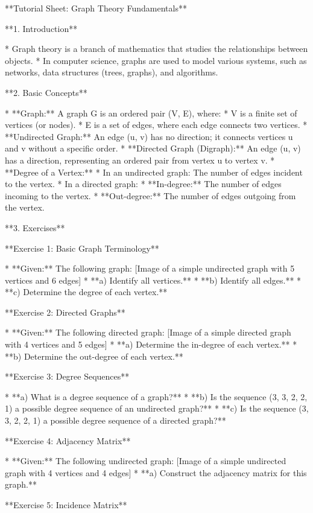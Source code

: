 **Tutorial Sheet: Graph Theory Fundamentals**

**1. Introduction**

*   Graph theory is a branch of mathematics that studies the relationships between objects. 
*   In computer science, graphs are used to model various systems, such as networks, data structures (trees, graphs), and algorithms.

**2. Basic Concepts**

*   **Graph:** A graph G is an ordered pair (V, E), where:
      *   V is a finite set of vertices (or nodes).
      *   E is a set of edges, where each edge connects two vertices.
*   **Undirected Graph:** An edge (u, v) has no direction; it connects vertices u and v without a specific order.
*   **Directed Graph (Digraph):** An edge (u, v) has a direction, representing an ordered pair from vertex u to vertex v.
*   **Degree of a Vertex:** 
      *   In an undirected graph: The number of edges incident to the vertex.
      *   In a directed graph: 
          *   **In-degree:** The number of edges incoming to the vertex.
          *   **Out-degree:** The number of edges outgoing from the vertex.

**3. Exercises**

**Exercise 1: Basic Graph Terminology**

*   **Given:** The following graph:
      [Image of a simple undirected graph with 5 vertices and 6 edges]
*   **a) Identify all vertices.**
*   **b) Identify all edges.**
*   **c) Determine the degree of each vertex.**

**Exercise 2: Directed Graphs**

*   **Given:** The following directed graph:
      [Image of a simple directed graph with 4 vertices and 5 edges]
*   **a) Determine the in-degree of each vertex.**
*   **b) Determine the out-degree of each vertex.**

**Exercise 3: Degree Sequences**

*   **a) What is a degree sequence of a graph?**
*   **b) Is the sequence (3, 3, 2, 2, 1) a possible degree sequence of an undirected graph?**
*   **c) Is the sequence (3, 3, 2, 2, 1) a possible degree sequence of a directed graph?**

**Exercise 4: Adjacency Matrix**

*   **Given:** The following undirected graph:
      [Image of a simple undirected graph with 4 vertices and 4 edges]
*   **a) Construct the adjacency matrix for this graph.**

**Exercise 5: Incidence Matrix**

